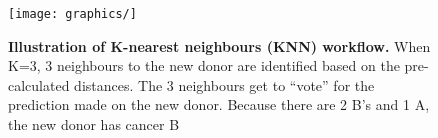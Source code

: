 \begin{figure}[h!]
    \centering
    \texttt{[image: graphics/]}
    \caption{\textbf{Illustration of K-nearest neighbours (KNN) workflow.} When K=3, 3 neighbours to the new donor are identified based on the pre-calculated distances. The 3 neighbours get to ``vote'' for the prediction made on the new donor. Because there are 2 B's and 1 A, the new donor has cancer B}
    \label{fig:knn_demo}
\end{figure}
